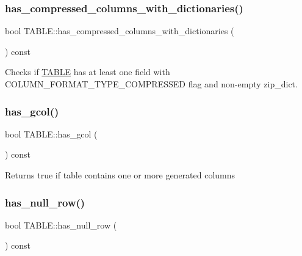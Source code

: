 \subsubsection{\texorpdfstring{has\+\_\+compressed\+\_\+columns\+\_\+with\+\_\+dictionaries()}{has\_compressed\_columns\_with\_dictionaries()}}
{\footnotesize\ttfamily bool T\+A\+B\+L\+E\+::has\+\_\+compressed\+\_\+columns\+\_\+with\+\_\+dictionaries (\begin{DoxyParamCaption}{ }\end{DoxyParamCaption}) const}

Checks if \mbox{\hyperlink{structTABLE}{T\+A\+B\+LE}} has at least one field with C\+O\+L\+U\+M\+N\+\_\+\+F\+O\+R\+M\+A\+T\+\_\+\+T\+Y\+P\+E\+\_\+\+C\+O\+M\+P\+R\+E\+S\+S\+ED flag and non-\/empty zip\+\_\+dict. \mbox{\label{structTABLE_aad8a536a238e7ab616e3dfae56b61e40}} 
\subsubsection{\texorpdfstring{has\+\_\+gcol()}{has\_gcol()}}
{\footnotesize\ttfamily bool T\+A\+B\+L\+E\+::has\+\_\+gcol (\begin{DoxyParamCaption}{ }\end{DoxyParamCaption}) const\hspace{0.3cm}{\ttfamily [inline]}}

\begin{DoxyReturn}{Returns}
true if table contains one or more generated columns 
\end{DoxyReturn}
\mbox{\label{structTABLE_a2191adf5a1a988c85541e06ab3e6a86e}} 
\subsubsection{\texorpdfstring{has\+\_\+null\+\_\+row()}{has\_null\_row()}}
{\footnotesize\ttfamily bool T\+A\+B\+L\+E\+::has\+\_\+null\+\_\+row (\begin{DoxyParamCaption}{ }\end{DoxyParamCaption}) const\hspace{0.3cm}{\ttfamily [inline]}}

